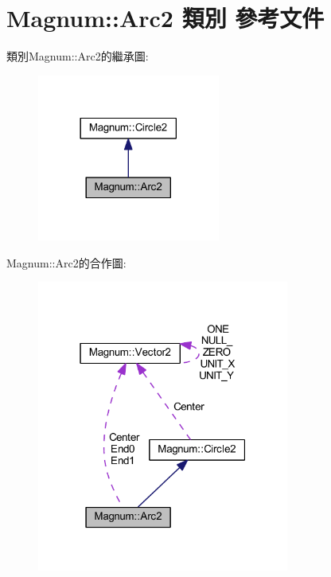 \hypertarget{class_magnum_1_1_arc2}{}\section{Magnum\+:\+:Arc2 類別 參考文件}
\label{class_magnum_1_1_arc2}


類別\+Magnum\+:\+:Arc2的繼承圖\+:\nopagebreak
\begin{figure}[H]
\begin{center}
\leavevmode
\includegraphics[width=170pt]{class_magnum_1_1_arc2__inherit__graph}
\end{center}
\end{figure}


Magnum\+:\+:Arc2的合作圖\+:\nopagebreak
\begin{figure}[H]
\begin{center}
\leavevmode
\includegraphics[width=235pt]{class_magnum_1_1_arc2__coll__graph}
\end{center}
\end{figure}
